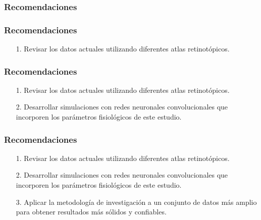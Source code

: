 \documentclass[
11pt, %
%
aspectratio=169, %
]{beamer}
\begin{document}
	\begin{frame}
		\frametitle{Recomendaciones}
		
	\end{frame}
       
    \begin{frame}
    	\frametitle{Recomendaciones}
    	\begin{minipage}[t][0.8\textheight][t]{\textwidth}
    		\begin{itemize}
    				\item [1.] Revisar los datos actuales utilizando diferentes atlas retinotópicos.
    			
    		\end{itemize}
    	\end{minipage}
    	
   \end{frame} 
    \begin{frame}
    	\frametitle{Recomendaciones}
    	
    	\begin{minipage}[t][0.8\textheight][t]{\textwidth}
    		\begin{itemize}
    			\item [1.] Revisar los datos actuales utilizando diferentes atlas retinotópicos.
    		
    		\item [2.] Desarrollar simulaciones con redes neuronales convolucionales que incorporen los parámetros fisiológicos de este estudio. 
    		
    			
    		\end{itemize}
    	\end{minipage}
    	
    	 
    \end{frame}
    \begin{frame}
    	\frametitle{Recomendaciones}
    	
    	\begin{minipage}[t][0.8\textheight][t]{\textwidth}
    		\begin{itemize}
    			\item [1.] Revisar los datos actuales utilizando diferentes atlas retinotópicos.
    		
    			\item [2.] Desarrollar simulaciones con redes neuronales convolucionales que incorporen los parámetros fisiológicos de este estudio. 
    		
    			\item[3.] Aplicar la metodología de investigación a un conjunto de datos más amplio para obtener resultados más sólidos y confiables.
    			
    		\end{itemize}
    	\end{minipage}
    	
   \end{frame} 
\end{document}
